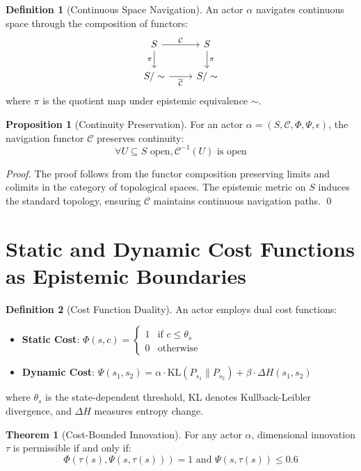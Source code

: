 \documentclass[11pt]{article}
\theoremstyle{definition}
\newtheorem{definition}{Definition}
\newtheorem{theorem}{Theorem}
\newtheorem{proposition}{Proposition}
\begin{document}
\begin{definition}[Continuous Space Navigation]
An actor $\alpha$ navigates continuous space through the composition of functors:
\[\begin{tikzcd}
S \arrow[r, "\mathcal{C}"] \arrow[d, "\pi"'] & S \arrow[d, "\pi"] \\
S/\sim \arrow[r, "\overline{\mathcal{C}}"'] & S/\sim
\end{tikzcd}\]
where $\pi$ is the quotient map under epistemic equivalence $\sim$.
\end{definition}

\begin{proposition}[Continuity Preservation]
For an actor $\alpha = (S, \mathcal{C}, \Phi, \Psi, \epsilon)$, the navigation functor $\mathcal{C}$ preserves continuity:
\[\forall U \subseteq S \text{ open}, \mathcal{C}^{-1}(U) \text{ is open}\]
\end{proposition}

\begin{proof}
The proof follows from the functor composition preserving limits and colimits in the category of topological spaces. The epistemic metric on $S$ induces the standard topology, ensuring $\mathcal{C}$ maintains continuous navigation paths. \qed
\end{proof}

\section{Static and Dynamic Cost Functions as Epistemic Boundaries}

\begin{definition}[Cost Function Duality]
An actor employs dual cost functions:
\begin{itemize}
    \item \textbf{Static Cost}: $\Phi(s, c) = \begin{cases} 1 & \text{if } c \leq \theta_s \\ 0 & \text{otherwise} \end{cases}$
    \item \textbf{Dynamic Cost}: $\Psi(s_1, s_2) = \alpha \cdot \text{KL}(P_{s_1} \| P_{s_2}) + \beta \cdot \Delta H(s_1, s_2)$
\end{itemize}
where $\theta_s$ is the state-dependent threshold, KL denotes Kullback-Leibler divergence, and $\Delta H$ measures entropy change.
\end{definition}

\begin{theorem}[Cost-Bounded Innovation]
For any actor $\alpha$, dimensional innovation $\tau$ is permissible if and only if:
\[\Phi(\tau(s), \Psi(s, \tau(s))) = 1 \text{ and } \Psi(s, \tau(s)) \leq 0.6\]
\end{theorem}
\end{document}
